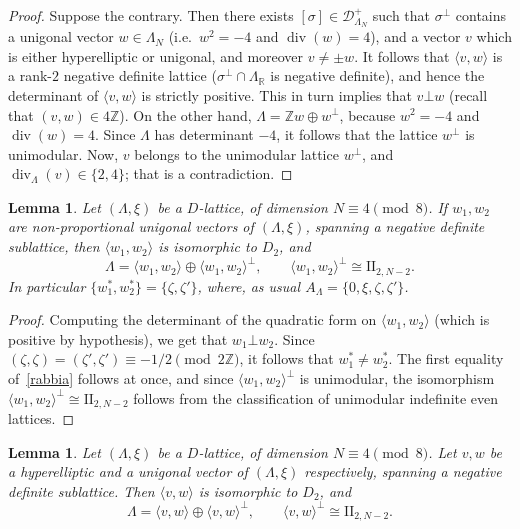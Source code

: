 \documentclass[11pt]{amsart}
\numberwithin{equation}{subsection}
\theoremstyle{plain}
\newtheorem{lemma}[theorem]{Lemma}
\theoremstyle{remark}
\theoremstyle{definition}
\newcommand{\II}{\textrm{II}}
\newcommand{\cD}{{\mathscr D}}
\newcommand{\la}{\langle}
\newcommand{\ra}{\rangle}
\newcommand{\RR}{{\mathbb R}}
\newcommand{\ZZ}{{\mathbb Z}}
\DeclareMathOperator{\divisore}{div}
\begin{document}
%
%
\begin{proof}
%
Suppose the contrary. Then there exists $[\sigma]\in\cD_{\Lambda_N}^{+}$ such that $\sigma^{\bot}$ contains a unigonal vector $w\in\Lambda_N$ (i.e.~$w^2=-4$ and $\divisore(w)=4$), and a vector $v$ which is either  hyperelliptic or unigonal, and moreover $v\not=\pm w$. It follows that $\la v,w\ra$ is a rank-$2$ negative definite lattice ($\sigma^{\bot}\cap\Lambda_{\RR}$ is negative definite), and hence the determinant of $\la v,w\ra$ is strictly positive. This in turn implies that  $v\bot w$ (recall that $(v,w)\in 4\ZZ$). 
 On the other hand, $\Lambda=\ZZ w\oplus w^{\bot}$, because $w^2=-4$ and $\divisore(w)=4$. Since $\Lambda$ has determinant $-4$, it follows that the lattice $w^{\bot}$ is unimodular. Now, $v$ belongs to the unimodular lattice $w^{\bot}$, and $\divisore_{\Lambda}(v)\in\{2,4\}$; that is a contradiction.
%
\end{proof}
%
%
\begin{lemma}\label{lmm:twounig}
%
Let  $(\Lambda,\xi)$ be a    $D$-lattice, of dimension $N\equiv 4\pmod{8}$. If $w_1,w_2$ are non-proportional unigonal vectors of $(\Lambda,\xi)$, spanning a negative definite sublattice, then   $\la w_1,w_2\ra$  is isomorphic to $D_2$, and  
%
\begin{equation}\label{rabbia}
%
\Lambda=\la w_1,w_2\ra\oplus \la w_1,w_2\ra^{\bot},\qquad \la w_1,w_2\ra^{\bot}\cong \II_{2,N-2}.
%
\end{equation}
%
In particular $\{w_1^{*},w_2^{*}\}=\{\zeta,\zeta'\}$, where, as usual $A_{\Lambda}=\{0,\xi,\zeta,\zeta'\}$.
%
\end{lemma}
%
%
\begin{proof}
%
Computing the determinant of the quadratic form on $\la w_1,w_2\ra$ (which is positive by hypothesis), we get that $w_1\bot w_2$. Since $(\zeta,\zeta)=(\zeta',\zeta')\equiv -1/2\pmod{2\ZZ}$, it follows that $w_1^{*}\not= w_2^{*}$. The first equality 
of~\eqref{rabbia} follows at once, and since  $\la w_1,w_2\ra^{\bot}$ is unimodular, the isomorphism $\la w_1,w_2\ra^{\bot}\cong \II_{2,N-2}$ follows from the classification of unimodular indefinite even lattices.
%
\end{proof}
%
%
\begin{lemma}\label{lmm:unigandhyp}
%
Let  $(\Lambda,\xi)$ be a    $D$-lattice, of dimension $N\equiv 4\pmod{8}$. Let $v,w$ be a hyperelliptic and a unigonal vector of $(\Lambda,\xi)$ respectively, spanning a negative definite sublattice. Then  $\la v,w\ra$  is isomorphic to $D_2$, and  
%
\begin{equation}\label{ditwoperp}
%
\Lambda=\la v,w\ra\oplus \la v,w\ra^{\bot},\qquad \la v,w\ra^{\bot}\cong \II_{2,N-2}.
%
\end{equation}
%
%
\end{lemma}
\end{document}
